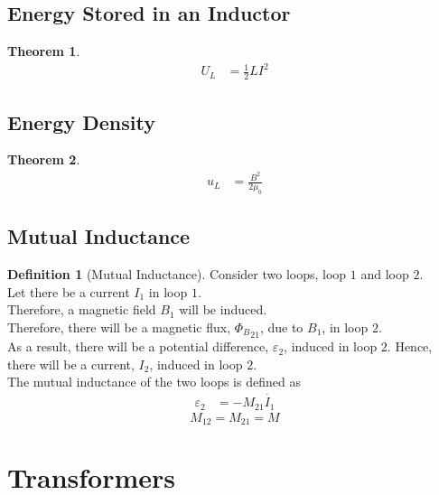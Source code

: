 \documentclass[fleqn, a4paper, 8pt, twoside]{amsart}
\theoremstyle{definition}
\newtheorem{definition}{Definition}
\theoremstyle{theorem}
\newtheorem{theorem}{Theorem}
\begin{document}
\begin{multicols}{2}
\begin{spacing}{0.6}
\subsection{Energy Stored in an Inductor}

\begin{theorem}
	\begin{align*}
		U_L &= \frac{1}{2} L I^2
	\end{align*}
\end{theorem}

\subsection{Energy Density}

\begin{theorem}
	\begin{align*}
		u_L &= \frac{B^2}{2 \mu_0}
	\end{align*}
\end{theorem}

\subsection{Mutual Inductance}

\begin{definition}[Mutual Inductance]
	Consider two loops, loop $1$ and loop $2$.\\
	Let there be a current $I_1$ in loop $1$.\\
	Therefore, a magnetic field $B_1$ will be induced.\\
	Therefore, there will be a magnetic flux, ${\Phi_{B}}_{2 1}$, due to $B_1$, in loop $2$.\\
	As a result, there will be a potential difference, $\varepsilon_2$, induced in loop $2$.
	Hence, there will be a current, $I_2$, induced in loop $2$.\\
	The mutual inductance of the two loops is defined as
	\begin{align*}
		\varepsilon_2 &= -M_{2 1} \dot{I_1}
	\end{align*}
	\begin{equation*}
		M_{1 2} = M_{2 1} = M
	\end{equation*}
\end{definition}

\section{Transformers}


\end{spacing}
\end{multicols}
\end{document}
